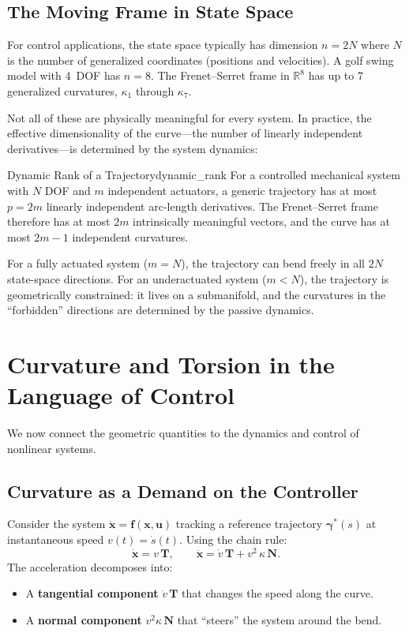 \documentclass[12pt, openany]{book}
\theoremstyle{plain}
\newcommand{\state}{\bm{x}}
\newcommand{\control}{\bm{u}}
\newcommand{\traj}{\bm{\gamma}}
\newcommand{\Reals}{\mathbb{R}}
\newcommand{\tangent}{\bm{T}}
\newcommand{\normal}{\bm{N}}
\begin{document}
\subsection{The Moving Frame in State Space}

For control applications, the state space typically has dimension $n = 2N$ where
$N$ is the number of generalized coordinates (positions and velocities). A golf
swing model with 4~DOF has $n = 8$. The Frenet--Serret frame in $\Reals^8$
has up to 7 generalized curvatures, $\kappa_1$ through $\kappa_7$.

Not all of these are physically meaningful for every system. In practice, the
effective dimensionality of the curve---the number of linearly independent
derivatives---is determined by the system dynamics:

\begin{principle}{Dynamic Rank of a Trajectory}{dynamic_rank}
  For a controlled mechanical system with $N$ DOF and $m$ independent actuators,
  a generic trajectory has at most $p = 2m$ linearly independent arc-length
  derivatives. The Frenet--Serret frame therefore has at most $2m$ intrinsically
  meaningful vectors, and the curve has at most $2m - 1$ independent curvatures.

  For a fully actuated system ($m = N$), the trajectory can bend freely in all
  $2N$ state-space directions. For an underactuated system ($m < N$), the
  trajectory is geometrically constrained: it lives on a submanifold, and the
  curvatures in the ``forbidden'' directions are determined by the passive
  dynamics.
\end{principle}

\section{Curvature and Torsion in the Language of Control}

We now connect the geometric quantities to the dynamics and control of
nonlinear systems.

\subsection{Curvature as a Demand on the Controller}

Consider the system $\dot{\state} = \bm{f}(\state, \control)$ tracking a
reference trajectory $\traj^*(s)$ at instantaneous speed $v(t) = \dot{s}(t)$.
Using the chain rule:
\begin{equation}
  \dot{\state} = v\, \tangent, \qquad
  \ddot{\state} = \dot{v}\, \tangent + v^2\, \kappa\, \normal.
\end{equation}
The acceleration decomposes into:
\begin{itemize}[leftmargin=1.5cm]
  \item A \textbf{tangential component} $\dot{v}\, \tangent$ that changes the
    speed along the curve.
  \item A \textbf{normal component} $v^2\kappa\, \normal$ that ``steers'' the
    system around the bend.
\end{itemize}
\end{document}
